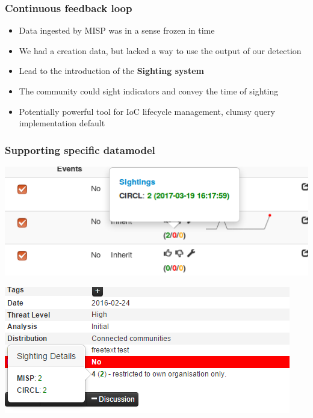\begin{frame}
  \frametitle{Continuous feedback loop}
  \begin{itemize}
    \item Data ingested by MISP was in a sense frozen in time
    \item We had a creation data, but lacked a way to use the output of our detection
    \item Lead to the introduction of the {\bf Sighting system}
    \item The community could sight indicators and convey the time of sighting
    \item Potentially powerful tool for IoC lifecycle management, clumsy query implementation default
  \end{itemize}
\end{frame}

\begin{frame}
  \frametitle{Supporting specific datamodel}
  \begin{center}
    \includegraphics[scale=0.3]{sighting-n.png}
  \end{center}
  \begin{center}
    \includegraphics[scale=0.34]{Sightings2.PNG}
  \end{center}  
\end{frame}

